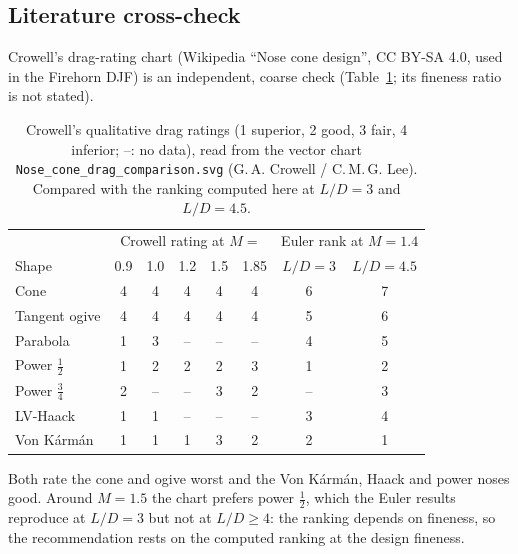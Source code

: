 

\subsection{Literature cross-check}
\label{sec:crowell}

Crowell's drag-rating chart (Wikipedia ``Nose cone design'', CC BY-SA 4.0, used in the Firehorn DJF) is an
independent, coarse check (Table~\ref{tab:crowell}; its fineness ratio is not stated).

\begin{table}[H]
\centering
\caption{Crowell's qualitative drag ratings (1 superior, 2 good, 3 fair, 4 inferior; --: no data),
read from the vector chart \texttt{Nose\_cone\_drag\_comparison.svg} (G.\,A. Crowell / C.\,M.\,G.
Lee). Compared with the ranking computed here at $L/D=3$ and $L/D=4.5$.}
\label{tab:crowell}
\small
\begin{tabular}{@{}lccccc|cc@{}}
\toprule
 & \multicolumn{5}{c|}{Crowell rating at $M =$} & \multicolumn{2}{c}{Euler rank at $M=1.4$} \\
Shape & 0.9 & 1.0 & 1.2 & 1.5 & 1.85 & $L/D=3$ & $L/D=4.5$ \\
\midrule
Cone & 4 & 4 & 4 & 4 & 4 & 6 & 7 \\
Tangent ogive & 4 & 4 & 4 & 4 & 4 & 5 & 6 \\
Parabola & 1 & 3 & -- & -- & -- & 4 & 5 \\
Power $\tfrac12$ & 1 & 2 & 2 & 2 & 3 & 1 & 2 \\
Power $\tfrac34$ & 2 & -- & -- & 3 & 2 & -- & 3 \\
LV-Haack & 1 & 1 & -- & -- & -- & 3 & 4 \\
Von K\'arm\'an & 1 & 1 & 1 & 3 & 2 & 2 & 1 \\
\bottomrule
\end{tabular}
\end{table}

Both rate the cone and ogive worst and the Von K\'arm\'an, Haack and power noses good. Around $M = 1.5$ the
chart prefers power $\tfrac12$, which the Euler results reproduce at $L/D = 3$ but not at $L/D \geq 4$: the
ranking depends on fineness, so the recommendation rests on the computed ranking at the design fineness.

